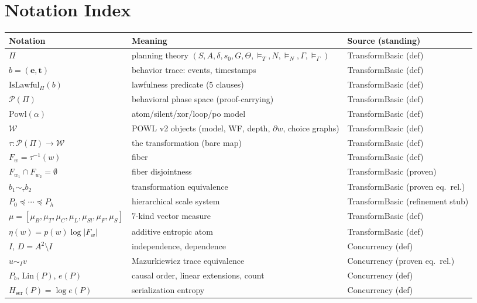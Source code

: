 \documentclass[11pt]{article}
\newcommand{\PT}{\Pi}                          %
\newcommand{\PS}{\mathcal{P}(\PT)}             %
\newcommand{\WS}{\mathcal{W}}                  %
\newcommand{\tmap}{\tau}                       %
\newcommand{\fib}[1]{F_{#1}}                   %
\newcommand{\traceEq}[1]{\sim_{#1}}            %
\newcommand{\Lin}{\mathrm{Lin}}
\newcommand{\Hser}{H_{\mathrm{ser}}}
\theoremstyle{plain}
\theoremstyle{definition}
\begin{document}
\section{Notation Index}
\label{sec:index}

\begin{longtable}{@{}lll@{}}
\toprule
Notation & Meaning & Source (standing) \\
\midrule
$\PT$ & planning theory $(S, A, \delta, s_0, G, \Theta, \models_T, N, \models_N, \Gamma, \models_\Gamma)$ & TransformBasic (def) \\
$b = (\mathbf{e}, \mathbf{t})$ & behavior trace: events, timestamps & TransformBasic (def) \\
$\mathrm{IsLawful}_\PT(b)$ & lawfulness predicate (5 clauses) & TransformBasic (def) \\
$\PS$ & behavioral phase space (proof-carrying) & TransformBasic (def) \\
$\mathrm{Powl}(\alpha)$ & atom/silent/xor/loop/po model & TransformBasic (def) \\
$\WS$ & POWL v2 objects (model, WF, depth, $\partial w$, choice graphs) & TransformBasic (def) \\
$\tmap : \PS \to \WS$ & the transformation (bare map) & TransformBasic (def) \\
$\fib{w} = \tmap^{-1}(w)$ & fiber & TransformBasic (def) \\
$\fib{w_1} \cap \fib{w_2} = \emptyset$ & fiber disjointness & TransformBasic (proven) \\
$b_1 \sim_\tmap b_2$ & transformation equivalence & TransformBasic (proven eq.\ rel.) \\
$P_0 \preceq \cdots \preceq P_h$ & hierarchical scale system & TransformBasic (refinement stub) \\
$\mu = [\mu_B, \mu_T, \mu_C, \mu_L, \mu_{Sl}, \mu_F, \mu_S]$ & 7-kind vector measure & TransformBasic (def) \\
$\eta(w) = p(w)\log|\fib{w}|$ & additive entropic atom & TransformBasic (def) \\
$I$, $D = A^2 \setminus I$ & independence, dependence & Concurrency (def) \\
$u \traceEq{I} v$ & Mazurkiewicz trace equivalence & Concurrency (proven eq.\ rel.) \\
$P_b$, $\Lin(P)$, $e(P)$ & causal order, linear extensions, count & Concurrency (def) \\
$\Hser(P) = \log e(P)$ & serialization entropy & Concurrency (def) \\

\end{longtable}
\end{document}
